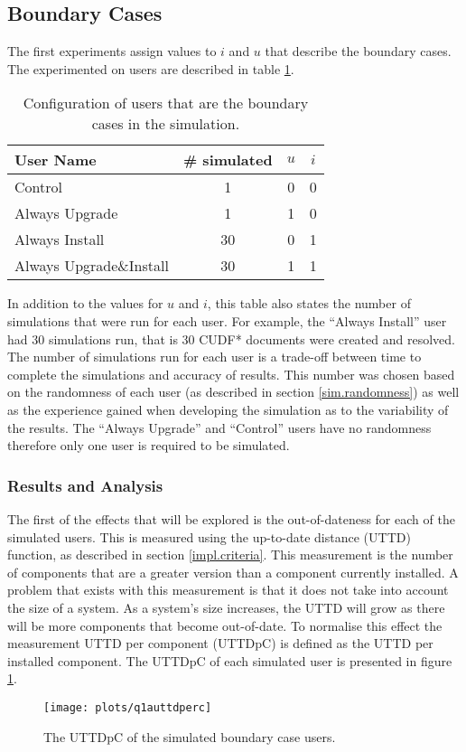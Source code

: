 \subsection{Boundary Cases}
The first experiments assign values to $i$ and $u$ that describe the boundary cases.
The experimented on users are described in table \ref{exp.tblextremeusers}.
\begin{table}[h!]
\centering
\begin{tabular}{|l | c | c | c |}
\hline
User Name 				 	& \# simulated 	& $u$ 		& $i$ 			\\ \hline
Control						& 1 			& 0			& 0				\\
Always Upgrade				& 1 			& 1			& 0				 \\
Always Install 				& 30 			& 0			& 1				 \\
Always Upgrade\&Install 	& 30 			& 1			& 1				\\ \hline
\end{tabular}
\caption{Configuration of users that are the boundary cases in the simulation.}
\label{exp.tblextremeusers}
\end{table}
In addition to the values for $u$ and $i$, this table also states the number of simulations that were run for each user.
For example, the ``Always Install'' user had 30 simulations run, that is 30 CUDF* documents were created and resolved.
The number of simulations run for each user is a trade-off between time to complete the simulations and accuracy of results.
This number was chosen based on the randomness of each user (as described in section \ref{sim.randomness}) 
as well as the experience gained when developing the simulation as to the variability of the results.
The ``Always Upgrade'' and ``Control'' users have no randomness therefore only one user is required to be simulated.

\subsubsection{Results and Analysis}
The first of the effects that will be explored is the out-of-dateness for each of the simulated users.
This is measured using the up-to-date distance (UTTD) function, as described in section \ref{impl.criteria}.
This measurement is the number of components that are a greater version than a component currently installed.
A problem that exists with this measurement is that it does not take into account the size of a system.
As a system's size increases, the UTTD will grow as there will be more components that become out-of-date.
To normalise this effect the measurement UTTD per component (UTTDpC) is defined as the UTTD per installed component.
The UTTDpC of each simulated user is presented in figure \ref{exp.q1auttdpc}.
\begin{figure}[htp]
\begin{center}
  \texttt{[image: plots/q1auttdperc]}
  \caption{The UTTDpC of the simulated boundary case users.}
  \label{exp.q1auttdpc}
\end{center}
\end{figure}

